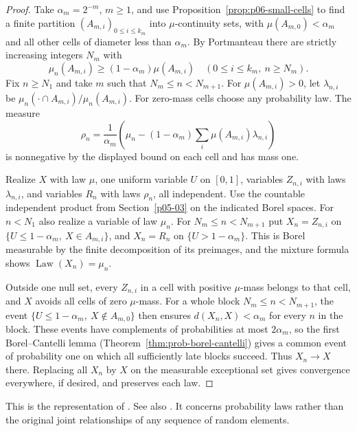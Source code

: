 \documentclass[11pt,oneside,openany]{book}
\DeclareMathOperator{\Law}{Law}
\theoremstyle{plain}
\theoremstyle{definition}
\theoremstyle{remark}
\begin{document}
\begin{proof}
Take \(\alpha_m=2^{-m}\), \(m\geq1\), and use
Proposition~\ref{prop:p06-small-cells} to find a finite partition
\((A_{m,i})_{0\leq i\leq k_m}\) into \(\mu\)-continuity sets,
with \(\mu(A_{m,0})<\alpha_m\) and all other cells of diameter
less than \(\alpha_m\). By Portmanteau there are strictly increasing
integers \(N_m\) with
\[
 \mu_n(A_{m,i})\geq(1-\alpha_m)\mu(A_{m,i})
 \quad(0\leq i\leq k_m,\ n\geq N_m).
\]
Fix \(n\geq N_1\) and take \(m\) such that \(N_m\leq n<N_{m+1}\).
For \(\mu(A_{m,i})>0\), let \(\lambda_{n,i}\) be
\(\mu_n(\cdot\cap A_{m,i})/\mu_n(A_{m,i})\). For zero-mass cells
choose any probability law. The measure
\[
 \rho_n=\frac{1}{\alpha_m}\left(\mu_n-
               (1-\alpha_m)\sum_i\mu(A_{m,i})\lambda_{n,i}\right)
\]
is nonnegative by the displayed bound on each cell and has mass one.

Realize \(X\) with law \(\mu\), one uniform variable \(U\) on
\([0,1]\), variables \(Z_{n,i}\) with laws \(\lambda_{n,i}\),
and variables \(R_n\) with laws \(\rho_n\), all independent.
Use the countable independent product from Section~\ref{p05-03}
on the indicated Borel spaces. For \(n<N_1\) also realize a
variable of law \(\mu_n\). For \(N_m\leq n<N_{m+1}\) put
\(X_n=Z_{n,i}\) on
\(\{U\leq1-\alpha_m,\ X\in A_{m,i}\}\), and \(X_n=R_n\)
on \(\{U>1-\alpha_m\}\). This is Borel measurable by the
finite decomposition of its preimages, and the mixture formula
shows \(\Law(X_n)=\mu_n\).

Outside one null set, every \(Z_{n,i}\) in a cell with positive
\(\mu\)-mass belongs to that cell, and \(X\) avoids all cells of
zero \(\mu\)-mass. For a whole block \(N_m\leq n<N_{m+1}\), the
event \(\{U\leq1-\alpha_m,\ X\notin A_{m,0}\}\) then ensures
\(d(X_n,X)<\alpha_m\) for every \(n\) in the block. These events
have complements of probabilities at most \(2\alpha_m\), so
the first Borel--Cantelli lemma (Theorem~\ref{thm:prob-borel-cantelli}) gives a common event of
probability one on which all sufficiently late blocks succeed.
Thus \(X_n\to X\) there. Replacing all \(X_n\) by \(X\) on
the measurable exceptional set gives convergence everywhere,
if desired, and preserves each law.
\end{proof}

This is the representation of \cite[Theorem 6.7, pp.~70--71]{Billingsley}.
See also \cite[Theorem 5.31, pp.~119--120]{Kallenberg}. It concerns
probability laws rather than the original joint relationships of
any sequence of random elements.
\end{document}
